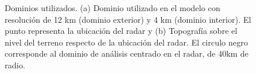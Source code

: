 \documentclass[12pt,spanish,oneside, a4paper]{book}
\begin{document}
\begin{figure}

{\centering {}\hfill{}

}

\caption{Dominios utilizados. (a) Dominio utilizado en el modelo con resolución de 12 km (dominio exterior) y 4 km (dominio interior). El punto representa la ubicación del radar y (b) Topografía sobre el nivel del terreno respecto de la ubicación del radar. El circulo negro corresponde al dominio de análisis centrado en el radar, de 40km de radio. \label{dominio}}\label{fig:dominio}
\end{figure}
\end{document}
